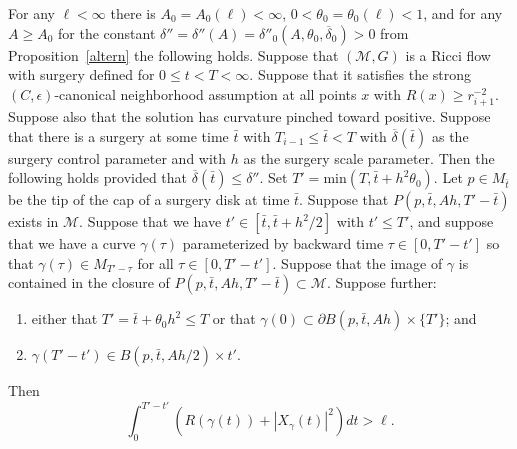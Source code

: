 \begin{proposition}
\label{prop:long-L-length-near-surgery-cap}
\label{bigell}
For any $\ell<\infty$ there is $A_0=A_0(\ell)<\infty$,
$0<\theta_0=\theta_0(\ell)<1$, and for any $A\ge A_0$ for the
constant
$\delta''=\delta''(A)=\delta''_0(A,\theta_0,\overline\delta_0)>0$
from Proposition~\ref{altern} the following holds. Suppose that
$({\mathcal M},G)$ is a Ricci flow with surgery defined for $0\le
t< T<\infty$. Suppose that it satisfies the strong
$(C,\epsilon)$-canonical neighborhood assumption at all points $x$
with $R(x)\ge r_{i+1}^{-2}$. Suppose also that the solution has
curvature pinched toward positive. Suppose that there is a surgery
at some time $\bar t$ with $T_{i-1}\le \bar t<T$ with
$\overline\delta(\bar t)$ as the surgery control parameter and with
$h$ as the surgery scale parameter. Then the following holds
provided that $\overline\delta(\bar t)\le \delta''$. Set $T'=\mathrm{min}(T,\bar t+h^2\theta_0 )$. Let $p\in M_{\bar t}$ be the tip of
the cap of a surgery disk at time $\bar t$. Suppose that $P(p,\bar
t,Ah,T'-\bar t)$ exists in ${\mathcal M}$. Suppose that we have
$t'\in [\bar t,\bar t+h^2/2]$ with $t'\le T'$, and suppose that we
have a curve $\gamma(\tau)$ parameterized by backward time $\tau\in
[0,T'- t']$ so that $\gamma(\tau)\in M_{T'-\tau}$ for all $\tau\in
[0,T'- t']$. Suppose that the image of $\gamma$ is contained in the
closure of $P(p,\bar t,Ah,T'-\bar t)\subset {\mathcal M}$. Suppose
further:
\begin{enumerate}
\item[(1)] either that $T'=\bar t +\theta_0 h^2\le T$ or
that $\gamma(0)\subset \partial B(p,\bar t,Ah)\times\{T'\}$; and
\item[(2)]  $\gamma(T'-t')\in B(p,\bar t,Ah/2)\times{t'}$.
\end{enumerate}
Then
$$\int_0^{T'- t'}\left(R(\gamma(t))+|X_\gamma(t)|^2\right)dt>\ell.$$

\end{proposition}





